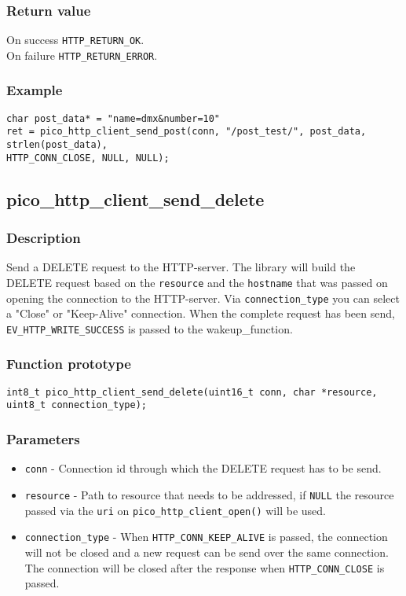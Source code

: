 \subsubsection*{Return value}
On success \texttt{HTTP\_RETURN\_OK}.
\\On failure \texttt{HTTP\_RETURN\_ERROR}.
\subsubsection*{Example}
\begin{verbatim}
char post_data* = "name=dmx&number=10"
ret = pico_http_client_send_post(conn, "/post_test/", post_data, strlen(post_data),
HTTP_CONN_CLOSE, NULL, NULL);
\end{verbatim}


\subsection{pico\_http\_client\_send\_delete}

\subsubsection*{Description}
Send a DELETE request to the HTTP-server. The library will build the DELETE request based on the \texttt{resource} and the \texttt{hostname} that was passed on opening the connection to the HTTP-server. Via \texttt{connection\_type} you can select a "Close" or "Keep-Alive" connection. When the complete request has been send, \texttt{EV\_HTTP\_WRITE\_SUCCESS} is passed to the wakeup\_function.

\subsubsection*{Function prototype}
\texttt{int8\_t pico\_http\_client\_send\_delete(uint16\_t conn, char *resource, uint8\_t connection\_type);}

\subsubsection*{Parameters}
\begin{itemize}[noitemsep]
\item \texttt{conn} - Connection id through which the DELETE request has to be send.
\item \texttt{resource} - Path to resource that needs to be addressed, if \texttt{NULL} the resource passed via the \texttt{uri} on \texttt{pico\_http\_client\_open()} will be used.
\item \texttt{connection\_type} - When \texttt{HTTP\_CONN\_KEEP\_ALIVE} is passed, the connection will not be closed and a new request can be send over the same connection. The connection will be closed after the response when \texttt{HTTP\_CONN\_CLOSE} is passed.
\end{itemize}
